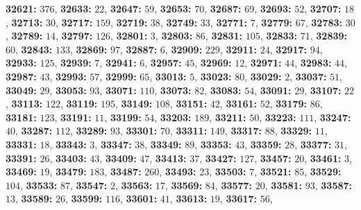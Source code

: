 \textsf{\bfseries 32621:} $376$, \textsf{\bfseries 32633:} $22$, \textsf{\bfseries 32647:} $59$, \textsf{\bfseries 32653:} $70$, \textsf{\bfseries 32687:} $69$, \textsf{\bfseries 32693:} $52$, \textsf{\bfseries 32707:} $18$, \textsf{\bfseries 32713:} $30$, \textsf{\bfseries 32717:} $159$, \textsf{\bfseries 32719:} $38$, \textsf{\bfseries 32749:} $33$, \textsf{\bfseries 32771:} $7$, \textsf{\bfseries 32779:} $67$, \textsf{\bfseries 32783:} $30$, \textsf{\bfseries 32789:} $14$, \textsf{\bfseries 32797:} $126$, \textsf{\bfseries 32801:} $3$, \textsf{\bfseries 32803:} $86$, \textsf{\bfseries 32831:} $105$, \textsf{\bfseries 32833:} $71$, \textsf{\bfseries 32839:} $60$, \textsf{\bfseries 32843:} $133$, \textsf{\bfseries 32869:} $97$, \textsf{\bfseries 32887:} $6$, \textsf{\bfseries 32909:} $229$, \textsf{\bfseries 32911:} $24$, \textsf{\bfseries 32917:} $94$, \textsf{\bfseries 32933:} $125$, \textsf{\bfseries 32939:} $7$, \textsf{\bfseries 32941:} $6$, \textsf{\bfseries 32957:} $45$, \textsf{\bfseries 32969:} $12$, \textsf{\bfseries 32971:} $44$, \textsf{\bfseries 32983:} $44$, \textsf{\bfseries 32987:} $43$, \textsf{\bfseries 32993:} $57$, \textsf{\bfseries 32999:} $65$, \textsf{\bfseries 33013:} $5$, \textsf{\bfseries 33023:} $80$, \textsf{\bfseries 33029:} $2$, \textsf{\bfseries 33037:} $51$, \textsf{\bfseries 33049:} $29$, \textsf{\bfseries 33053:} $93$, \textsf{\bfseries 33071:} $110$, \textsf{\bfseries 33073:} $82$, \textsf{\bfseries 33083:} $54$, \textsf{\bfseries 33091:} $29$, \textsf{\bfseries 33107:} $22$, \textsf{\bfseries 33113:} $122$, \textsf{\bfseries 33119:} $195$, \textsf{\bfseries 33149:} $108$, \textsf{\bfseries 33151:} $42$, \textsf{\bfseries 33161:} $52$, \textsf{\bfseries 33179:} $86$, \textsf{\bfseries 33181:} $123$, \textsf{\bfseries 33191:} $11$, \textsf{\bfseries 33199:} $54$, \textsf{\bfseries 33203:} $189$, \textsf{\bfseries 33211:} $50$, \textsf{\bfseries 33223:} $111$, \textsf{\bfseries 33247:} $40$, \textsf{\bfseries 33287:} $112$, \textsf{\bfseries 33289:} $93$, \textsf{\bfseries 33301:} $70$, \textsf{\bfseries 33311:} $149$, \textsf{\bfseries 33317:} $88$, \textsf{\bfseries 33329:} $11$, \textsf{\bfseries 33331:} $18$, \textsf{\bfseries 33343:} $3$, \textsf{\bfseries 33347:} $38$, \textsf{\bfseries 33349:} $89$, \textsf{\bfseries 33353:} $43$, \textsf{\bfseries 33359:} $28$, \textsf{\bfseries 33377:} $31$, \textsf{\bfseries 33391:} $26$, \textsf{\bfseries 33403:} $43$, \textsf{\bfseries 33409:} $47$, \textsf{\bfseries 33413:} $37$, \textsf{\bfseries 33427:} $127$, \textsf{\bfseries 33457:} $20$, \textsf{\bfseries 33461:} $3$, \textsf{\bfseries 33469:} $19$, \textsf{\bfseries 33479:} $183$, \textsf{\bfseries 33487:} $260$, \textsf{\bfseries 33493:} $23$, \textsf{\bfseries 33503:} $7$, \textsf{\bfseries 33521:} $85$, \textsf{\bfseries 33529:} $104$, \textsf{\bfseries 33533:} $87$, \textsf{\bfseries 33547:} $2$, \textsf{\bfseries 33563:} $17$, \textsf{\bfseries 33569:} $84$, \textsf{\bfseries 33577:} $20$, \textsf{\bfseries 33581:} $93$, \textsf{\bfseries 33587:} $13$, \textsf{\bfseries 33589:} $26$, \textsf{\bfseries 33599:} $116$, \textsf{\bfseries 33601:} $41$, \textsf{\bfseries 33613:} $19$, \textsf{\bfseries 33617:} $56$, 

